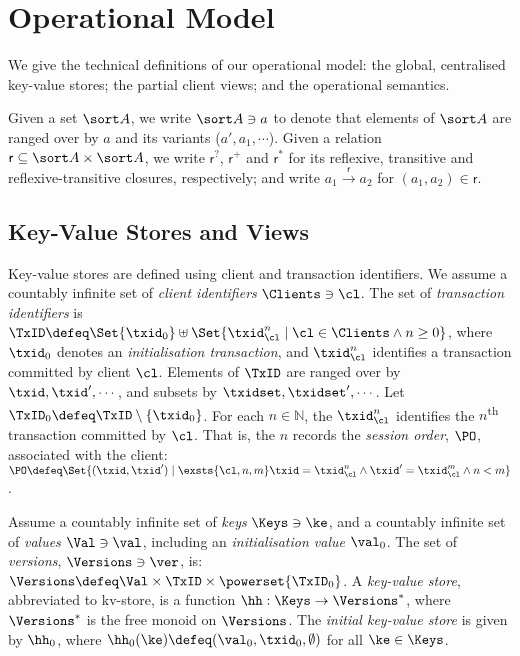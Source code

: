 \section{Operational Model}
\label{sec:model}


We give the technical definitions of our operational model: 
the global, centralised key-value stores; the partial client views;  and the
operational semantics. 

Given a set $\sort A$, we write $\sort A \ni a$ to denote that elements of $\sort A$ are ranged over by $a$ and its variants (\eg $a', a_1, \cdots$). 
Given a relation $\mathsf r \subseteq \sort A \times \sort A$,
we write $\mathsf r^?$, $\mathsf r^+$ and $\mathsf r^*$ for its reflexive, transitive and reflexive-transitive closures, respectively;
and write $a_1 \xrightarrow{\mathsf r} a_2$ for $(a_1, a_2) \in \mathsf r$.
\subsection{Key-Value Stores and Views}
\label{subsec:kvstores}
\label{sec:mkvs-view}
Key-value stores are defined using client and transaction identifiers.
We assume a countably infinite set of \emph{client identifiers} $\Clients \ni \cl$. 
The set of \emph{transaction identifiers} is  
$\TxID \defeq  \Set{\txid_{0}} \uplus \Set{ \txid_{\cl}^{n} \mid \cl
  \in \Clients \wedge n \geq 0 }$, 
where  $\txid_0$ denotes  an \emph{initialisation transaction}, 
and $\txid_{\cl}^{n}$ identifies a transaction committed by client $\cl$. 
Elements of $\TxID$ are ranged over by
$\txid, \txid', \cdots$, and subsets by $\txidset, \txidset', \cdots$. 
Let $\TxID_{0} \defeq \TxID \setminus \{ \txid_0\}$. 
For each $n \in \mathbb{N}$, the $\txid_{\cl}^{n}$ identifies the $n$\textsuperscript{th} transaction  committed by $\cl$.
That is, the $n$ records  the \emph{session order}, $\PO$, associated with
the client: 
$\PO \defeq \Set{ (\txid, \txid') \mid \exsts{ \cl, n,m } \txid =
  \txid_{\cl}^{n} \wedge \txid' = \txid_{\cl}^{m} \wedge n < m}$.

\begin{definition}
\label{def:his_heap}
\label{def:mkvs}
Assume a countably infinite set of \emph{keys} $\Keys \ni \ke$, 
and a countably infinite set of  \emph{values} $\Val \ni \val$, 
including an \emph{initialisation value} $\val_0 $.
The set of \emph{versions}, $\Versions \ni \ver$, is: $\Versions \defeq \Val \times \TxID \times \powerset{\TxID_{0}}$. 
A \emph{key-value store}, abbreviated to kv-store,  is a function $\hh: \Keys \rightarrow \Versions^{\ast}$, 
where $\Versions^{\ast}$ is the free monoid on $\Versions$. 
The \emph{initial key-value store} is given by $\hh_0$, where 
$\hh_{0}(\ke)\defeq  (\val_0, \txid_0, \emptyset)$ for
all $\ke \in \Keys$.



\end{definition}


